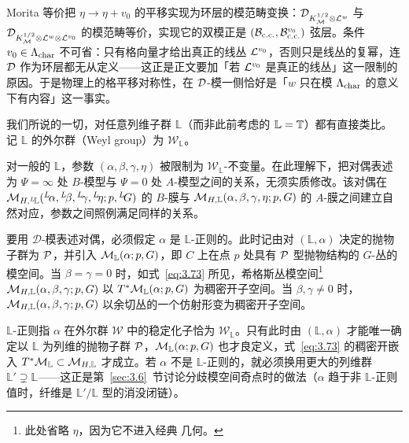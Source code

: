 \begin{yizhu}[含糊点拨]
Morita 等价把 $\eta\to\eta+v_0$ 的平移实现为环层的模范畴变换：${\mathcal D}_{K_{\mathcal{M}}^{1/2}\otimes{\mathcal L}^w}$ 与 ${\mathcal D}_{K_{\mathcal{M}}^{1/2}\otimes{\mathcal L}^w\otimes{\mathcal L}^{v_0}}$ 的模范畴等价，实现它的双模正是 $({\mathcal B}_{\rm c.c.},{\mathcal B}_{\rm c.c.}^{v_0})$ 弦层。条件 $v_0\in\Lambda_{\rm char}$ 不可省：只有格向量才给出真正的线丛 ${\mathcal L}^{v_0}$，否则只是线丛的复幂，连 ${\mathcal D}$ 作为环层都无从定义——这正是正文要加「若 ${\mathcal L}^{v_0}$ 是真正的线丛」这一限制的原因。于是物理上的格平移对称性，在 ${\mathcal D}$-模一侧恰好是「$w$ 只在模 $\Lambda_{\rm char}$ 的意义下有内容」这一事实。
\end{yizhu}

\bigskip{}

我们所说的一切，对任意列维子群 $\mathbb{L}$（而非此前考虑的 $\mathbb{L}={\mathbb{T}}$）都有直接类比。
记 $\mathbb{L}$ 的外尔群（Weyl group）为 ${\mathcal W}_\mathbb{L}$。

对一般的 $\mathbb{L}$，参数 $(\alpha,\beta,\gamma,\eta)$ 被限制为
${\mathcal W}_\mathbb{L}$-不变量。在此理解下，把对偶表述为 $\Psi=\infty$ 处 $B$-模型与 $\Psi=0$ 处 $A$-模型之间的关系，无须实质修改。该对偶在
${\mathcal{M}}_{H,{}^L\negthinspace\mathbb{L}}({}^L\negthinspace\alpha,{}^L\negthinspace\beta,{}^L\negthinspace\gamma,{}^L\negthinspace\eta;p,{}^L\negthinspace G)$
的 $B$-膜与 ${\mathcal{M}}_{H,\mathbb{L}}(\alpha,\beta,\gamma,\eta;p,G)$ 的 $A$-膜之间建立自然对应，参数之间照例满足同样的关系。

要用 ${\mathcal D}$-模表述对偶，必须假定 $\alpha$ 是
$\mathbb{L}$-正则的。此时记由对 $(\mathbb{L},\alpha)$ 决定的抛物子群为 $\mathcal{P}$，并引入 ${\mathcal{M}}_\mathbb{L}(\alpha;p,G)$，即 $C$ 上在点 $p$ 处具有 $\mathcal{P}$ 型抛物结构的 $G$-丛的模空间。当 $\beta=\gamma=0$ 时，如式~\eqref{eq:3.73} 所见，希格斯丛模空间\footnote{此处省略 $\eta$，因为它不进入经典
几何。} ${\mathcal{M}}_{H,\mathbb{L}}(\alpha,\beta,\gamma;p,G)$ 以
$T^*{{\mathcal{M}}}_\mathbb{L}(\alpha;p,G)$
为稠密开子空间。当 $\beta,\gamma\not=0$ 时，
${\mathcal{M}}_{H,\mathbb{L}}(\alpha,\beta,\gamma;p,G)$ 以余切丛的一个仿射形变为稠密开子空间。

\begin{yizhu}[易错点]
$\mathbb{L}$-正则指 $\alpha$ 在外尔群 ${\mathcal W}$ 中的稳定化子恰为 ${\mathcal W}_\mathbb{L}$。只有此时由 $(\mathbb{L},\alpha)$ 才能唯一确定以 $\mathbb{L}$ 为列维的抛物子群 $\mathcal{P}$，${\mathcal{M}}_\mathbb{L}(\alpha;p,G)$ 也才良定义，式~\eqref{eq:3.73} 的稠密开嵌入 $T^*{\mathcal{M}}_\mathbb{L}\subset{\mathcal{M}}_{H,\mathbb{L}}$ 才成立。若 $\alpha$ 不是 $\mathbb{L}$-正则的，就必须换用更大的列维群 $\mathbb{L}'\supsetneq\mathbb{L}$——这正是第~\ref{sec:3.6}~节讨论分歧模空间奇点时的做法（$\alpha$ 趋于非 $\mathbb{L}$-正则值时，纤维是 $\mathbb{L}'/\mathbb{L}$ 型的消没闭链）。
\end{yizhu}

